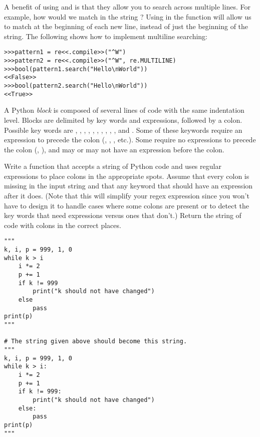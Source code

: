 A benefit of using  and  is that they allow you to search across multiple lines.
For example, how would we match  in the string \mbox{}?
Using  in the  function will allow us to match at the beginning of each new line, instead of just the beginning of the string.
The following shows how to implement multiline searching:

\begin{lstlisting}
>>>pattern1 = re<<.compile>>("^W")
>>>pattern2 = re<<.compile>>("^W", re.MULTILINE)
>>>bool(pattern1.search("Hello\nWorld"))
<<False>>
>>>bool(pattern2.search("Hello\nWorld"))
<<True>>
\end{lstlisting}

\begin{problem}
A Python \emph{block} is composed of several lines of code with the same indentation level.
Blocks are delimited by key words and expressions, followed by a colon.
Possible key words are , , , , , , , , , , and .
Some of these keywords require an expression to precede the colon (, , , etc.).
Some require no expressions to precede the colon (, ), and  may or may not have an expression before the colon. 

Write a function that accepts a string of Python code and uses regular expressions to place colons in the appropriate spots.
Assume that every colon is missing in the input string and that any keyword that should have an expression after it does. (Note that this will simplify your regex expression since you won't have to design it to handle cases where some colons are present or to detect the key words that need expressions versus ones that don't.) Return the string of code with colons in the correct places.

\begin{lstlisting}
"""
k, i, p = 999, 1, 0
while k > i
    i *= 2
    p += 1
    if k != 999
        print("k should not have changed")
    else
        pass
print(p)
"""

# The string given above should become this string.
"""
k, i, p = 999, 1, 0
while k > i:
    i *= 2
    p += 1
    if k != 999:
        print("k should not have changed")
    else:
        pass
print(p)
"""
\end{lstlisting}
\raggedright

\end{problem}

